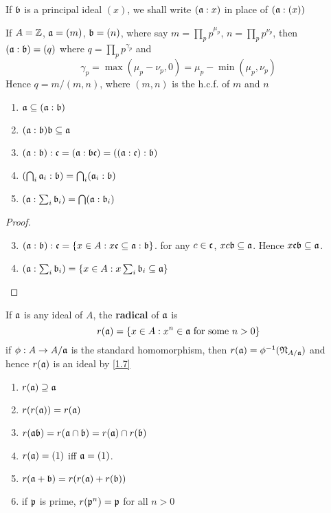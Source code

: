 \documentclass[11pt]{article}
\begin{document}
If \(\mathfrak{b}\) is a principal ideal \((x)\), we shall write \((\mathfrak{a}:x)\) in place of \((\mathfrak{a}:(x))\)

\begin{examplle}[]
If \(A=\mathbb{Z}\), \(\mathfrak{a}=(m)\), \(\mathfrak{b}=(n)\), where say \(m=\prod_pp^{\mu_p}\), \(n=\prod_pp^{\nu_p}\),
then \((\mathfrak{a}:\mathfrak{b})=(q)\) where \(q=\prod_pp^{\gamma_p}\) and
\begin{equation*}
\gamma_p=\max(\mu_p-\nu_p,0)=\mu_p-\min(\mu_p,\nu_p)
\end{equation*}
Hence \(q=m/(m,n)\), where \((m,n)\) is the h.c.f. of \(m\) and \(n\)
\end{examplle}

\begin{exercise}
\begin{enumerate}
\item \(\mathfrak{a}\subseteq(\mathfrak{a}:\mathfrak{b})\)
\item \((\mathfrak{a}:\mathfrak{b})\mathfrak{b}\subseteq\mathfrak{a}\)
\item \((\mathfrak{a}:\mathfrak{b}):\mathfrak{c}=(\mathfrak{a}:\mathfrak{b}\mathfrak{c})=((\mathfrak{a}:\mathfrak{c}):\mathfrak{b})\)
\item \((\bigcap_i\mathfrak{a}_i:\mathfrak{b})=\bigcap_i(\mathfrak{a}_i:\mathfrak{b})\)
\item \((\mathfrak{a}:\sum_i\mathfrak{b}_i)=\bigcap(\mathfrak{a}:\mathfrak{b}_i)\)
\end{enumerate}
\end{exercise}

\begin{proof}
\begin{enumerate}
\setcounter{enumi}{2}
\item \((\mathfrak{a}:\mathfrak{b}):\mathfrak{c}=\{x\in A:x\mathfrak{c}\subseteq\mathfrak{a}:\mathfrak{b}\}\). for any \(c\in\mathfrak{c}\), \(xc\mathfrak{b}\subseteq\mathfrak{a}\). Hence \(x\mathfrak{c}\mathfrak{b}\subseteq\mathfrak{a}\).
\setcounter{enumi}{4}
\item \((\mathfrak{a}:\sum_i\mathfrak{b}_i)=\{x\in A:x\sum_i\mathfrak{b}_i\subseteq\mathfrak{a}\}\)
\end{enumerate}
\end{proof}

If \(\mathfrak{a}\) is any ideal of \(A\), the \textbf{radical} of \(\mathfrak{a}\) is
\begin{equation*}
r(\mathfrak{a})=\{x\in A:x^n\in\mathfrak{a}\text{ for some }n>0\}
\end{equation*}
if \(\phi:A\to A/\mathfrak{a}\) is the standard homomorphism, then \(r(\mathfrak{a})=\phi^{-1}(\mathfrak{N}_{A/\mathfrak{a}})\) and hence \(r(\mathfrak{a})\)
is an ideal by \ref{1.7}

\begin{exercise}
\begin{enumerate}
\item \(r(\mathfrak{a})\supseteq\mathfrak{a}\)
\item \(r(r(\mathfrak{a}))=r(\mathfrak{a})\)
\item \(r(\mathfrak{a}\mathfrak{b})=r(\mathfrak{a}\cap\mathfrak{b})=r(\mathfrak{a})\cap r(\mathfrak{b})\)
\item \(r(\mathfrak{a})=(1)\) iff \(\mathfrak{a}=(1)\).
\item \(r(\mathfrak{a}+\mathfrak{b})=r(r(\mathfrak{a})+r(\mathfrak{b}))\)
\item if \(\mathfrak{p}\) is prime, \(r(\mathfrak{p}^n)=\mathfrak{p}\) for all \(n>0\)
\end{enumerate}
\end{exercise}
\end{document}
